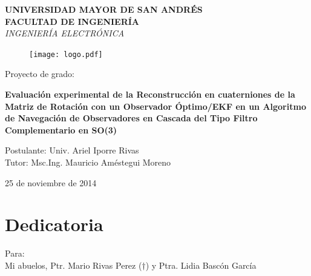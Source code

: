 \documentclass[10pt]{report}
\numberwithin{equation}{chapter}
\numberwithin{algorithm}{chapter}
\begin{document}
\renewcommand{\listtablename}{Índice de tablas} 
\renewcommand{\tablename}{Tabla}
\begin{titlepage}
\begin{center}\textbf{\large UNIVERSIDAD MAYOR DE SAN ANDRÉS}\\ \textbf{\normalsize FACULTAD DE INGENIERÍA}\\ \textit{\small INGENIERÍA ELECTRÓNICA}\\[17mm]\end{center}
\begin{figure} [h]
\begin{center}
\texttt{[image: logo.pdf]}
\label{first}
\end{center}
\end{figure}
\begin{center}
Proyecto de grado:
\end{center}
\begin{center}
\textbf{\Large Evaluación experimental de la Reconstrucción en cuaterniones de la Matriz de Rotación con un Observador Óptimo/EKF en un Algoritmo de Navegación de Observadores en Cascada del Tipo Filtro Complementario en SO(3)}\\[12mm]
\end{center}
\begin{center}\large
Postulante: Univ. Ariel Iporre Rivas\\Tutor: Msc.Ing. Mauricio Améstegui Moreno\\[13mm] 
\end{center}
\begin{center}
25 de noviembre de 2014
\end{center}
\end{titlepage}
\newpage
\chapter*{Dedicatoria}
\vspace{3cm}\hspace{4cm}\begin{minipage}{7cm}
Para:\\ Mi abuelos, Ptr. Mario Rivas Perez ($\dagger$) y Ptra. Lidia Bascón García
\end{minipage}
\thispagestyle{empty}
\setcounter{page}{1}
\newpage
\end{document}
